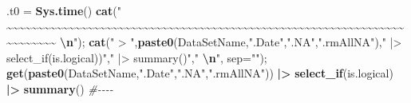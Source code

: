 \documentclass[
]{article}
\newenvironment{Shaded}{\begin{snugshade}}{\end{snugshade}}
\newcommand{\AttributeTok}[1]{\textcolor[rgb]{0.13,0.29,0.53}{#1}}
\newcommand{\CommentTok}[1]{\textcolor[rgb]{0.56,0.35,0.01}{\textit{#1}}}
\newcommand{\FunctionTok}[1]{\textcolor[rgb]{0.13,0.29,0.53}{\textbf{#1}}}
\newcommand{\NormalTok}[1]{#1}
\newcommand{\OtherTok}[1]{\textcolor[rgb]{0.56,0.35,0.01}{#1}}
\newcommand{\SpecialCharTok}[1]{\textcolor[rgb]{0.81,0.36,0.00}{\textbf{#1}}}
\newcommand{\StringTok}[1]{\textcolor[rgb]{0.31,0.60,0.02}{#1}}
\begin{document}
\begin{Shaded}
\begin{Highlighting}[]
\NormalTok{.t0 }\OtherTok{=} \FunctionTok{Sys.time}\NormalTok{()}
\FunctionTok{cat}\NormalTok{(}\StringTok{"    \textasciitilde{}\textasciitilde{}\textasciitilde{}\textasciitilde{}\textasciitilde{}\textasciitilde{}\textasciitilde{}\textasciitilde{}\textasciitilde{}\textasciitilde{}\textasciitilde{}\textasciitilde{}\textasciitilde{}\textasciitilde{}\textasciitilde{}\textasciitilde{}\textasciitilde{}\textasciitilde{}\textasciitilde{}\textasciitilde{}\textasciitilde{}\textasciitilde{}\textasciitilde{}\textasciitilde{}\textasciitilde{}\textasciitilde{}\textasciitilde{}\textasciitilde{}\textasciitilde{}\textasciitilde{}\textasciitilde{}\textasciitilde{}\textasciitilde{}\textasciitilde{}\textasciitilde{}\textasciitilde{}\textasciitilde{}\textasciitilde{}\textasciitilde{}\textasciitilde{}\textasciitilde{}\textasciitilde{}\textasciitilde{}\textasciitilde{}\textasciitilde{}\textasciitilde{}\textasciitilde{}\textasciitilde{}\textasciitilde{}\textasciitilde{}\textasciitilde{}\textasciitilde{}\textasciitilde{}\textasciitilde{}\textasciitilde{}\textasciitilde{}\textasciitilde{}\textasciitilde{}\textasciitilde{}\textasciitilde{}\textasciitilde{}\textasciitilde{}\textasciitilde{}\textasciitilde{}\textasciitilde{}\textasciitilde{}\textasciitilde{}\textasciitilde{}\textasciitilde{}\textasciitilde{}\textasciitilde{}\textasciitilde{}    }\SpecialCharTok{\textbackslash{}n}\StringTok{"}\NormalTok{); }\FunctionTok{cat}\NormalTok{(}\StringTok{" \textgreater{} "}\NormalTok{,}\FunctionTok{paste0}\NormalTok{(DataSetName,}\StringTok{".Date"}\NormalTok{,}\StringTok{".NA"}\NormalTok{,}\StringTok{".rmAllNA"}\NormalTok{),}\StringTok{" |\textgreater{} select\_if(is.logical))"}\NormalTok{,}\StringTok{" |\textgreater{} summary()"}\NormalTok{,}\StringTok{"  }\SpecialCharTok{\textbackslash{}n}\StringTok{"}\NormalTok{, }\AttributeTok{sep=}\StringTok{""}\NormalTok{); }\FunctionTok{get}\NormalTok{(}\FunctionTok{paste0}\NormalTok{(DataSetName,}\StringTok{".Date"}\NormalTok{,}\StringTok{".NA"}\NormalTok{,}\StringTok{".rmAllNA"}\NormalTok{)) }\SpecialCharTok{|\textgreater{}} \FunctionTok{select\_if}\NormalTok{(is.logical) }\SpecialCharTok{|\textgreater{}} \FunctionTok{summary}\NormalTok{() }\CommentTok{\#{-}{-}{-}{-}  }

\end{Highlighting}
\end{Shaded}
\end{document}
